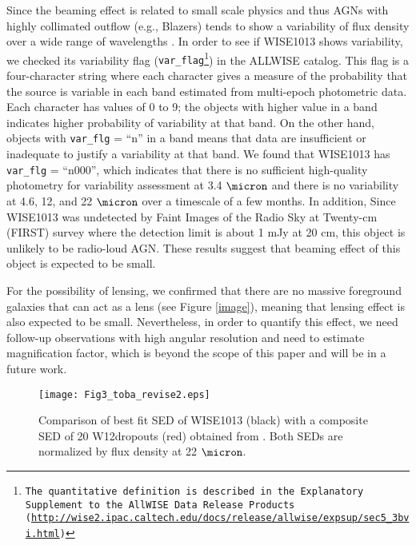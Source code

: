 \documentclass[twocolumn]{aastex6}
\begin{document}
Since the beaming effect is related to small scale physics and thus AGNs with highly collimated outflow (e.g.,  Blazers) tends to show a variability of flux density over a wide range of wavelengths \citep[e.g.,][]{Lister}.
In order to see if WISE1013 shows variability, we checked its variability flag ({\tt var\_flag\footnote{The quantitative definition is described in the Explanatory Supplement to the AllWISE Data Release Products (\url{http://wise2.ipac.caltech.edu/docs/release/allwise/expsup/sec5_3bvi.html})}}) in the ALLWISE catalog.
This flag is a four-character string where each character gives a measure of the probability that the source is variable in each band estimated from multi-epoch photometric data.
Each character has values of 0 to 9; the objects with higher value in a band indicates higher probability of variability at that band.
On the other hand, objects with {\tt var\_flg} = ``n'' in a band means that data are insufficient or inadequate to justify a variability at that band.
We found that  WISE1013 has {\tt var\_flg} = ``n000'', which indicates that there is no sufficient high-quality photometry for variability assessment at 3.4 $\micron$ and there is no variability at 4.6, 12, and 22 $\micron$ over a timescale of a few months. 
In addition, Since WISE1013 was undetected by Faint Images of the Radio Sky at Twenty-cm (FIRST) survey \citep{Becker} where the detection limit is about 1 mJy at 20 cm, this object is unlikely to be radio-loud AGN.
These results suggest that beaming effect of this object is expected to be small.

For the possibility of lensing, we confirmed that there are no massive foreground galaxies that can act as a lens (see Figure \ref{image}), meaning that lensing effect is also expected to be small.
Nevertheless, in order to quantify this effect, we need follow-up observations with high angular resolution and need to estimate magnification factor, which is beyond the scope of this paper and will be in a future work.

	\begin{figure}
   \centering
   \texttt{[image: Fig3\_toba\_revise2.eps]}
   \caption{Comparison of best fit SED of WISE1013 (black) with a composite SED of 20 W12dropouts (red) obtained from \cite{Tsai}. Both SEDs are normalized by flux density at 22 $\micron$.}
   \label{HDOGs}
   \end{figure}
           
\end{document}
